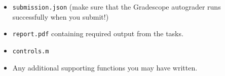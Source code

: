 \documentclass{article}
\theoremstyle{definition}
\begin{document}
\begin{itemize}[noitemsep]
    \item \texttt{submission.json} (make sure that the Gradescope autograder runs successfully when you submit!)
    \item \texttt{report.pdf} containing required output from the tasks.
    \item \texttt{controls.m}
    \item Any additional supporting functions you may have written.
\end{itemize}
\end{document}
